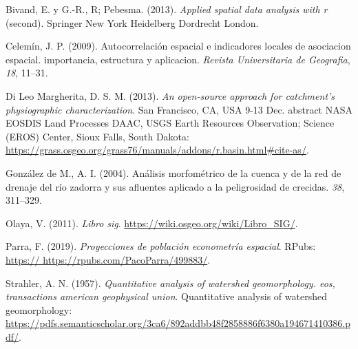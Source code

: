 \documentclass[11pt,]{article}
\begin{document}
\hypertarget{ref-AppliedSpatialDataAnalysis}{}
Bivand, E. y G.-R., R; Pebesma. (2013). \emph{Applied spatial data
analysis with r} (second). Springer New York Heidelberg Dordrecht
London.

\hypertarget{ref-Autocorrelacionespacial}{}
Celemín, J. P. (2009). Autocorrelación espacial e indicadores locales de
asociacion espacial. importancia, estructura y aplicacion. \emph{Revista
Universitaria de Geografia}, \emph{18}, 11--31.

\hypertarget{ref-physiograficCharacterization}{}
Di Leo Margherita, D. S. M. (2013). \emph{An open-source approach for
catchment's physiographic characterization}. San Francisco, CA, USA 9-13
Dec. abstract NASA EOSDIS Land Processes DAAC, USGS Earth Resources
Observation; Science (EROS) Center, Sioux Falls, South Dakota:
\url{https://grass.osgeo.org/grass76/manuals/addons/r.basin.html\#cite-as/}.

\hypertarget{ref-AnalisisMorfometrico}{}
González de M., A. I. (2004). Análisis morfométrico de la cuenca y de la
red de drenaje del río zadorra y sus afluentes aplicado a la
peligrosidad de crecidas. \emph{38}, 311--329.

\hypertarget{ref-LibroSIG}{}
Olaya, V. (2011). \emph{Libro sig}.
\url{https://wiki.osgeo.org/wiki/Libro_SIG/}.

\hypertarget{ref-ProyeccionesPEE}{}
Parra, F. (2019). \emph{Proyecciones de población econometría espacial}.
RPubs:
\href{https://\%20https://rpubs.com/PacoParra/499883/}{https:// https://rpubs.com/PacoParra/499883/}.

\hypertarget{ref-Quantitativeanalysis}{}
Strahler, A. N. (1957). \emph{Quantitative analysis of watershed
geomorphology. eos, transactions american geophysical union}.
Quantitative analysis of watershed geomorphology:
\url{https://pdfs.semanticscholar.org/3ca6/892addbb48f2858886f6380a194671410386.pdf/}.




\newpage
\singlespacing 
\end{document}
